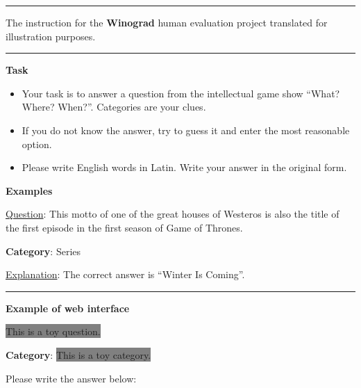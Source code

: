 \documentclass[11pt]{article}
\begin{document}
\begin{table*}[pt!]
\begin{minipage}[t]{.43\linewidth}
\par\noindent\rule{\textwidth}{1pt}

\caption{The instruction for the \textbf{Winograd} human evaluation project translated for illustration purposes.}
\label{table:winograd}

\end{minipage}

\end{table*} \begin{table*}[pht!]
\scriptsize

\begin{minipage}[t]{.43\linewidth}
\par\noindent\rule{\textwidth}{1pt}

\vspace{.5cm}

\textbf{Task}
\vspace{0.05cm}
\begin{itemize}[noitemsep,topsep=0.1pt]
    \item Your task is to answer a question from the intellectual game show ``What? Where? When?''. Categories are your clues.
    \item If you do not know the answer, try to guess it and enter the most reasonable option.
    \item Please write English words in Latin. Write your answer in the original form.
\end{itemize}


\vspace{0.2cm}
\textbf{Examples}
\vspace{0.05cm}


\noindent \underline{Question}: This motto of one of the great houses of Westeros is also the title of the first episode in the first season of Game of Thrones.
    
\noindent \textbf{Category}: Series

\noindent \underline{Explanation}:  The correct answer is ``Winter Is Coming''.

\par\noindent\rule{\textwidth}{0.8pt}

\vspace{0.05cm}
\textbf{Example of web interface}
\vspace{0.1cm}

\colorbox{Gray}{This is a toy question.}

\noindent \textbf{Category}: \colorbox{Gray}{This is a toy category.}

\vspace{0.1cm}
Please write the answer below:



\end{minipage}
\end{table*}
\end{document}

